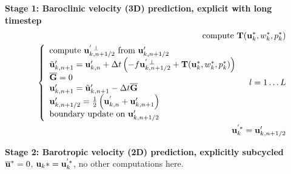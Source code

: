 \documentclass[11pt]{report}
\begin{document}
{\bf Stage 1: Baroclinic velocity (3D) prediction, explicit with long timestep}
\begin{eqnarray} &&
\mbox{compute } {\bf T}({\bf u}_k^*,w_k^*,p_k^*) \\ &&
\left\{\begin{array}{l} \label{u bcl s3} 
\mbox{compute }{\bf u}_{k,n+1/2}^{'\;\perp}\mbox{ from }{\bf u}_{k,n+1/2}'\\ 
{\tilde {\bf u}}'_{k,n+1} = {\bf u}'_{k,n} + \Delta t 
\left( -f{\bf u}_{k,n+1/2}^{'\;\perp} + {\bf T}({\bf u}_k^*,w_k^*,p_k^*) \right)
\\  
{\overline {\bf G}} = 0
\\ 
{\bf u}'_{k,n+1} = {\tilde {\bf u}}'_{k,n+1} - \Delta t {\overline {\bf G}}
\\
{\bf u}'_{k,n+1/2} = \frac{1}{2}\left({\bf u}^{'}_{k,n} +{\bf u}'_{k,n+1}\right) 
\\
\mbox{boundary update on }{\bf u}'_{k,n+1/2}
\end{array}
\right. \;\;\; l=1\ldots L \\ &&
{\bf u}^{'*}_k = {\bf u}'_{k,n+1/2}
\end{eqnarray}

{\bf Stage 2: Barotropic velocity (2D) prediction, explicitly subcycled}\\
$\overline{\bf u}^* = 0$, ${\bf u}_k* = {\bf u}^{'*}_k$, no other computations here.
\end{document}
